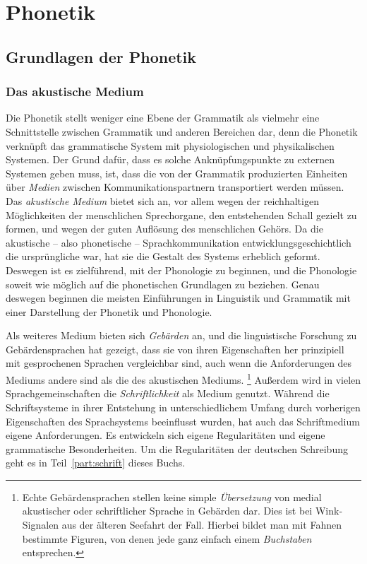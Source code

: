 \chapter{Phonetik}

\label{sec:phonetik}

\section{Grundlagen der Phonetik}

\subsection{Das akustische Medium}

\label{sec:akustischemedium}

Die Phonetik stellt weniger eine Ebene der Grammatik als vielmehr eine Schnittstelle zwischen Grammatik und anderen Bereichen dar, denn die Phonetik verknüpft das grammatische System mit physiologischen und physikalischen Systemen.
Der Grund dafür, dass es solche Anknüpfungspunkte zu externen Systemen geben muss, ist, dass die von der Grammatik produzierten Einheiten über \textit{Medien} zwischen Kommunikationspartnern transportiert werden müssen.
Das \textit{akustische Medium} bietet sich an, vor allem wegen der reichhaltigen Möglichkeiten der menschlichen Sprechorgane, den entstehenden Schall gezielt zu formen, und wegen der guten Auflösung des menschlichen Gehörs.
Da die akustische -- also phonetische -- Sprachkommunikation entwicklungsgeschichtlich die ursprüngliche war, hat sie die Gestalt des Systems erheblich geformt.
Deswegen ist es zielführend, mit der Phonologie zu beginnen, und die Phonologie soweit wie möglich auf die phonetischen Grundlagen zu beziehen.
Genau deswegen beginnen die meisten Einführungen in Linguistik und Grammatik mit einer Darstellung der Phonetik und Phonologie.

Als weiteres Medium bieten sich \textit{Gebärden} an, und die linguistische Forschung zu Gebärdensprachen hat gezeigt, dass sie von ihren Eigenschaften her prinzipiell mit gesprochenen Sprachen vergleichbar sind, auch wenn die Anforderungen des Mediums andere sind als die des akustischen Mediums.%
\footnote{Echte Gebärdensprachen stellen keine simple \textit{Übersetzung} von medial akustischer oder schriftlicher Sprache in Gebärden dar.
Dies ist \zB bei Wink-Signalen aus der älteren Seefahrt der Fall.
Hierbei bildet man mit Fahnen bestimmte Figuren, von denen jede ganz einfach einem \textit{Buchstaben} entsprechen.}
Außerdem wird in vielen Sprachgemeinschaften die \textit{Schriftlichkeit} als Medium genutzt.
Während die Schriftsysteme in ihrer Entstehung in unterschiedlichem Umfang durch vorherigen Eigenschaften des Sprachsystems beeinflusst wurden, hat auch das Schriftmedium eigene Anforderungen.
Es entwickeln sich eigene Regularitäten und eigene grammatische Besonderheiten.
Um die Regularitäten der deutschen Schreibung geht es in Teil~\ref{part:schrift} dieses Buchs.


